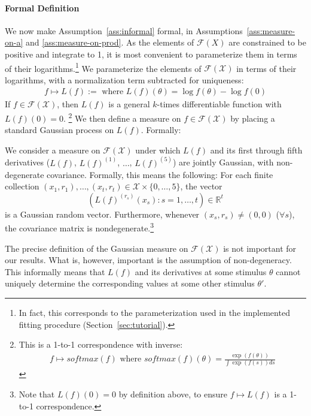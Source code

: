 \paragraph*{Formal Definition}
We now make Assumption~\ref{ass:informal} formal, in Assumptions~\ref{ass:measure-on-a} and \ref{ass:measure-on-prod}.
As the elements of $\mathcal{F}(X)$ are constrained to be positive and integrate to 1, it is most convenient to parameterize them in terms of their logarithms.\footnote{In fact, this corresponds to the parameterization used in the implemented fitting procedure (Section~\ref{sec:tutorial}).}
We parameterize the elements of $\mathcal{F}(\mathcal{X})$ in terms of their logarithms, with a normalization term subtracted for uniqueness:
\begin{align*}
f \mapsto L(f) := \text{ where } L(f)(\theta) = \log f(\theta) - \log f(0)
\end{align*}
If $f \in \mathcal{F}(\mathcal{X})$, then $L(f)$ is a general $k$-times differentiable function with $L(f)(0) = 0$.
\footnote{This is a 1-to-1 correspondence with inverse:
\begin{align*}
f \mapsto softmax(f)  \text{ where }  softmax(f)(\theta) = \frac{\exp(f(\theta))}{\int \exp(f(s)) ds} 
\end{align*}}
We then define a measure on $f \in \mathcal{F}(\mathcal{X})$ by placing a standard Gaussian process on $L(f)$. Formally:

\begin{assumption}\label{ass:measure-on-a}
We consider a measure on $\mathcal{F}(\mathcal{X})$ under which $L(f)$ and its first through fifth derivatives 
($L(f)$, $L(f)^{(1)}$, $\dots$, $L(f)^{(5)}$) are jointly Gaussian, with non-degenerate covariance.
Formally, this means the following: For each finite collection $(x_1, r_1), \dots, (x_t, r_t) \in \mathcal{X} \times \{0, \dots, 5\}$, the vector \[(L(f)^{(r_s)}(x_s) : s=1,\dots,t) \in \mathbb{R}^t\] is a Gaussian random vector. Furthermore, whenever $(x_s,r_s) \neq (0,0)$ ($\forall s$), the covariance matrix is nondegenerate.\footnote{Note that $L(f)(0) = 0$ by definition above, to ensure $f \mapsto L(f)$ is a 1-to-1 correspondence.}
\end{assumption}
The precise definition of the Gaussian measure on $\mathcal{F}(\mathcal{X})$ is not important for our results.
What is, however, important is the assumption of non-degeneracy. This informally means that $L(f)$ and its derivatives at some stimulus $\theta$ cannot uniquely determine the corresponding values at some other stimulus $\theta'$.

